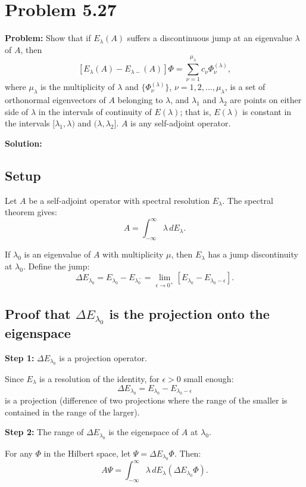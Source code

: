 \documentclass[12pt]{article}
\begin{document}
\section*{Problem 5.27}

\textbf{Problem:} Show that if $E_\lambda(A)$ suffers a discontinuous jump at an eigenvalue $\lambda$ of $A$, then
\[
[E_\lambda(A) - E_{\lambda-}(A)]\Phi = \sum_{\nu=1}^{\mu_\lambda}c_\nu\Phi_\nu^{(\lambda)},
\]
where $\mu_\lambda$ is the multiplicity of $\lambda$ and $\{\Phi_\nu^{(\lambda)}\}$, $\nu = 1, 2, \ldots, \mu_\lambda$, is a set of orthonormal eigenvectors of $A$ belonging to $\lambda$, and $\lambda_1$ and $\lambda_2$ are points on either side of $\lambda$ in the intervals of continuity of $E(\lambda)$; that is, $E(\lambda)$ is constant in the intervals $[\lambda_1, \lambda)$ and $(\lambda, \lambda_2]$. $A$ is any self-adjoint operator.

\bigskip
\textbf{Solution:}

\subsection*{Setup}

Let $A$ be a self-adjoint operator with spectral resolution $E_\lambda$. The spectral theorem gives:
\[
A = \int_{-\infty}^{\infty}\lambda\,dE_\lambda.
\]

If $\lambda_0$ is an eigenvalue of $A$ with multiplicity $\mu$, then $E_\lambda$ has a jump discontinuity at $\lambda_0$. Define the jump:
\[
\Delta E_{\lambda_0} = E_{\lambda_0} - E_{\lambda_0^-} = \lim_{\epsilon\to 0^+}[E_{\lambda_0} - E_{\lambda_0-\epsilon}].
\]

\subsection*{Proof that $\Delta E_{\lambda_0}$ is the projection onto the eigenspace}

\textbf{Step 1:} $\Delta E_{\lambda_0}$ is a projection operator.

Since $E_\lambda$ is a resolution of the identity, for $\epsilon > 0$ small enough:
\[
\Delta E_{\lambda_0} = E_{\lambda_0} - E_{\lambda_0-\epsilon}
\]
is a projection (difference of two projections where the range of the smaller is contained in the range of the larger).

\textbf{Step 2:} The range of $\Delta E_{\lambda_0}$ is the eigenspace of $A$ at $\lambda_0$.

For any $\Phi$ in the Hilbert space, let $\Psi = \Delta E_{\lambda_0}\Phi$. Then:
\[
A\Psi = \int_{-\infty}^{\infty}\lambda\,dE_\lambda(\Delta E_{\lambda_0}\Phi).
\]
\end{document}
